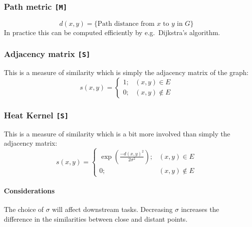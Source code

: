 \documentclass[12pt,a4paper]{article}
\newcommand{\1}[1]{\mathds{1}\left[#1\right]}
\begin{document}
\subsubsection{Path metric \texttt{[M]}}\label{sec:pathdist}
\[d(x,y)=\{\text{Path distance from $x$ to $y$ in $G$}\}\]
In practice this can be computed efficiently by e.g.~Dijkstra's algorithm.

\subsubsection{Adjacency matrix \texttt{[S]}}\label{sec:adjacency}
This is a measure of similarity which is simply the adjacency matrix of the graph:
\[s(x,y)=\begin{cases}1; & (x,y)\in E\\ 0; & (x,y)\not\in E\end{cases}\]

\subsubsection{Heat Kernel \texttt{[S]}}\label{sec:heat-kernel}
This is a measure of similarity which is a bit more involved than simply the adjacency matrix:
\[s(x,y)=\begin{cases}\exp\left(\frac{-d(x,y)^2}{2\sigma^2}\right); & (x,y)\in E\\ 0; & (x,y)\not\in E\end{cases}\]
\paragraph{Considerations} The choice of $\sigma$ will affect downstream tasks. Decreasing $\sigma$ increases the difference in the similarities between close and distant points.

\iffalse
\subsection{Choose your own distance or similarity!}
Sometimes, for a given dataset, no standard, domain-independent distance metric will make sense. In biology, for example, we can think of the distance between two species or individuals as a ``pseudotime'' of how long it would take one to evolve to the other. This depends on a particular model of evolution and probability of substituting certain base pairs for certain other base pairs, and can itself depend on real-world data. It would not make sense to, say, somehow convert the base pairs into numbers, embed the points in Euclidean space, use the Euclidean metric, and call it a day.
\fi
\end{document}
